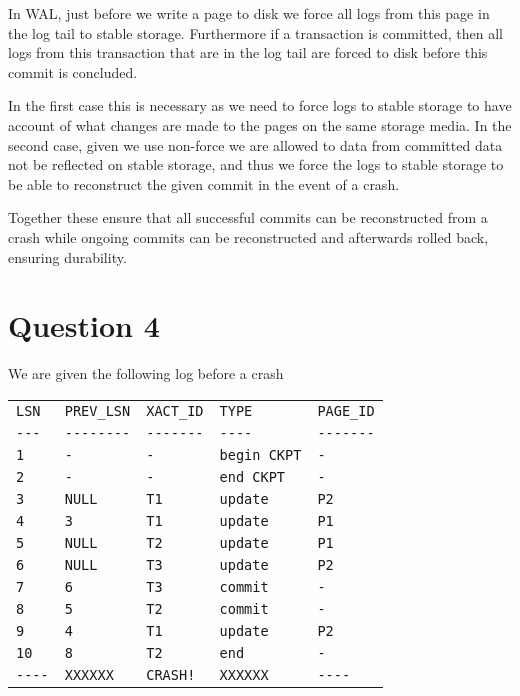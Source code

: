 \documentclass{article}
\begin{document}
In WAL, just before we write a page to disk we force all logs from this page in the log tail to stable storage. Furthermore if a transaction is committed, then all logs from this transaction that are in the log tail are forced to disk before this commit is concluded.

In the first case this is necessary as we need to force logs to stable storage to have account of what changes are made to the pages on the same storage media. In the second case, given we use non-force we are allowed to data from committed data not be reflected on stable storage, and thus we force the logs to stable storage to be able to reconstruct the given commit in the event of a crash.

Together these ensure that all successful commits can be reconstructed from a crash while ongoing commits can be reconstructed and afterwards rolled back, ensuring durability.

\section{Question 4}

We are given the following log before a crash
\begin{table}[h]
    \centering
    \begin{tabular}{lllll}
        \verb|LSN| & \verb|PREV_LSN| & \verb|XACT_ID| & \verb|TYPE| & \verb|PAGE_ID| \\
        \verb|---| & \verb|--------| & \verb|-------| & \verb|----| & \verb|-------| \\
        \verb|1| & \verb|-| & \verb|-| & \verb|begin CKPT| & \verb|-| \\
        \verb|2| & \verb|-| & \verb|-| & \verb|end CKPT| & \verb|-| \\
        \verb|3| & \verb|NULL| & \verb|T1| & \verb|update| & \verb|P2| \\
        \verb|4| & \verb|3| & \verb|T1| & \verb|update| & \verb|P1| \\
        \verb|5| & \verb|NULL| & \verb|T2| & \verb|update| & \verb|P1| \\
        \verb|6| & \verb|NULL| & \verb|T3| & \verb|update| & \verb|P2| \\
        \verb|7| & \verb|6| & \verb|T3| & \verb|commit| & \verb|-| \\
        \verb|8| & \verb|5| & \verb|T2| & \verb|commit| & \verb|-| \\
        \verb|9| & \verb|4| & \verb|T1| & \verb|update| & \verb|P2| \\
        \verb|10| & \verb|8| & \verb|T2| & \verb|end| & \verb|-| \\
        \verb|----| & \verb|XXXXXX | & \verb|CRASH!| & \verb|XXXXXX| & \verb|----| 
    \end{tabular}
\end{table}
\end{document}
